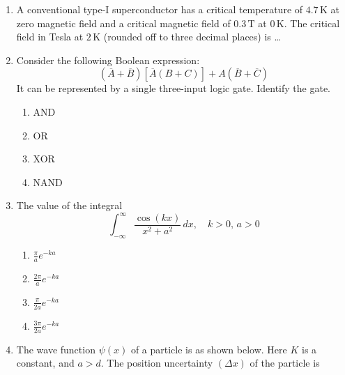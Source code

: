\documentclass[journal,12pt,onecolumn]{IEEEtran}
\begin{document}
\begin{enumerate}[itemsep=0.45cm]
\item A conventional type-I superconductor has a critical temperature of $4.7\,\mathrm{K}$ at zero magnetic field and a critical magnetic field of $0.3\,\mathrm{T}$ at $0\,\mathrm{K}$. The critical field in Tesla at $2\,\mathrm{K}$ (rounded off to three decimal places) is \dots

\hfill{}


\newpage

\item Consider the following Boolean expression:
    \[
    (\overline{A} + \overline{B})[\overline{A}(B + C)] + A(\overline{B} + \overline{C})
    \]
    It can be represented by a single three-input logic gate. Identify the gate.

\hfill{}


    \begin{multicols}{4}
    \begin{enumerate}
        \item AND
        \item OR
        \item XOR
        \item NAND
    \end{enumerate}
    \end{multicols}

\item The value of the integral 
    \[
    \int_{-\infty}^{\infty} \frac{\cos(kx)}{x^2 + a^2} \, dx, \quad k>0, \, a>0
    \]

\hfill{}


    \begin{multicols}{4}
    \begin{enumerate}
        \item $\frac{\pi}{a} e^{-ka}$
        \item $\frac{2\pi}{a} e^{-ka}$
        \item $\frac{\pi}{2a} e^{-ka}$
        \item $\frac{3\pi}{2a} e^{-ka}$
    \end{enumerate}
    \end{multicols}

\item The wave function $\psi(x)$ of a particle is as shown below. Here $K$ is a constant, and $a>d$. The position uncertainty $(\Delta x)$ of the particle is


\end{enumerate}
\end{document}
